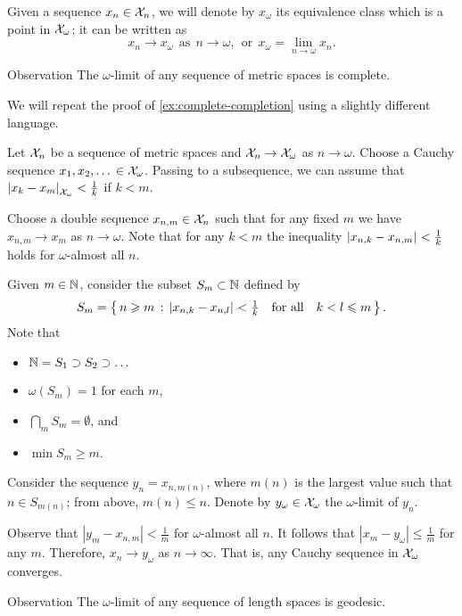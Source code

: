 Given a sequence $x_n\in \mathcal{X}_n$,
we will denote by $x_\omega$ its equivalence class which is a point in $\mathcal{X}_\omega$;
it can be written as
\[x_n\to x_\omega \ \ \text{as}\ \  n\to\omega,\ \ \text{or}\ \ x_\omega=\lim_{n\to\omega} x_n.\]

\begin{thm}{Observation}\label{obs:ultralimit-is-complete}
The $\omega$-limit of any sequence of metric spaces is complete. 
\end{thm}

We will repeat the proof of \ref{ex:complete-completion} using a slightly different language.

Let $\mathcal{X}_n$ be a sequence of metric spaces and $\mathcal{X}_n\to\mathcal{X}_\omega$ as $n\to\omega$.
Choose a Cauchy sequence $x_1,x_2,\dots{}\in\mathcal{X}_\omega$.
Passing to a subsequence, we can assume that $\dist{x_k}{x_{m}}{\spc{X}_\omega}<\tfrac1{k}$ if $k<m$.

Choose a double sequence $x_{n,m}\in \mathcal{X}_n$ such that for any fixed $m$ we have $x_{n,m}\to x_m$ as $n\to\omega$.
Note that for any $k<m$ the inequality $\dist{x_{n,k}}{x_{n,m}}{}<\tfrac1{k}$ holds for $\omega$-almost all $n$.

Given $m\in\mathbb{N}$, consider the subset $S_m\subset\mathbb{N}$ defined by
\[S_m=\set{n\ge m}{\dist{x_{n,k}}{x_{n,l}}{}<\tfrac1{k} \quad\text{for all}\quad k<l\le m}.\]
Note that 
\begin{itemize}
\item $\mathbb{N}= S_1\supset S_2\supset\dots$
\item $\omega(S_m)=1$ for each $m$, 
\item $\bigcap_m S_m=\emptyset$, and
\item $\min S_m\ge m$.
\end{itemize}

Consider the sequence $y_n=x_{n,m(n)}$, where $m(n)$ is the largest value such that $n\in S_{m(n)}$;
from above, $m(n)\le n$.
Denote by $y_\omega\in \mathcal{X}_\omega$ the $\omega$-limit of $y_n$.

Observe that $|y_m-x_{n,m}|<\tfrac1{m}$ for $\omega$-almost all $n$.
It follows that $|x_m-y_\omega|\le \tfrac1{m}$ for any $m$.
Therefore, $x_n\to y_\omega$ as $n\to \infty$.
That is, any Cauchy sequence in $\mathcal{X}_\omega$ converges.
\qeds

\begin{thm}{Observation}\label{obs:ultralimit-is-geodesic}
The $\omega$-limit of any sequence of length spaces is geodesic. 
\end{thm}

